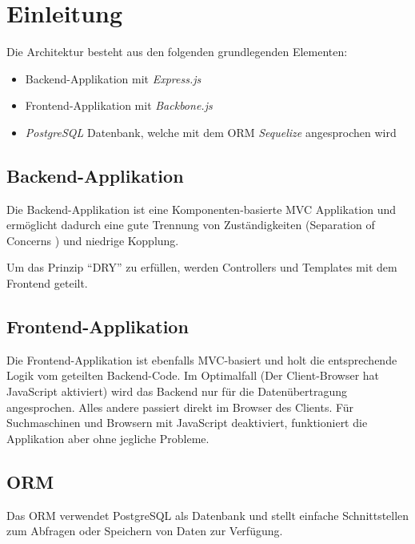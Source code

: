 \section{Einleitung}

Die Architektur besteht aus den folgenden grundlegenden Elementen:
\begin{itemize}
	\item Backend-Applikation mit \emph{Express.js} \cite{Expressjs}
	\item Frontend-Applikation mit \emph{Backbone.js} \cite{Backbonejs}
	\item \emph{PostgreSQL} \cite{PostgreSQL} Datenbank, welche mit dem \gls{ORM} \emph{Sequelize} \cite{Sequelize} angesprochen wird
\end{itemize}

\subsection{Backend-Applikation}

Die Backend-Applikation ist eine Komponenten-basierte MVC Applikation und ermöglicht dadurch eine gute Trennung von Zuständigkeiten (Separation of Concerns \cite{SeparationOfConcerns}) und niedrige Kopplung.

Um das Prinzip ``\gls{DRY}'' zu erfüllen, werden Controllers und Templates mit dem Frontend geteilt.

\subsection{Frontend-Applikation}

Die Frontend-Applikation ist ebenfalls MVC-basiert und holt die entsprechende Logik vom geteilten Backend-Code.
Im Optimalfall (Der Client-Browser hat JavaScript aktiviert) wird das Backend nur für die Datenübertragung angesprochen. Alles andere passiert direkt im Browser des Clients.
Für Suchmaschinen und Browsern mit JavaScript deaktiviert, funktioniert die Applikation aber ohne jegliche Probleme.

\subsection{ORM}

Das \gls{ORM} verwendet PostgreSQL \cite{PostgreSQL} als Datenbank und stellt einfache Schnittstellen zum Abfragen oder Speichern von Daten zur Verfügung.